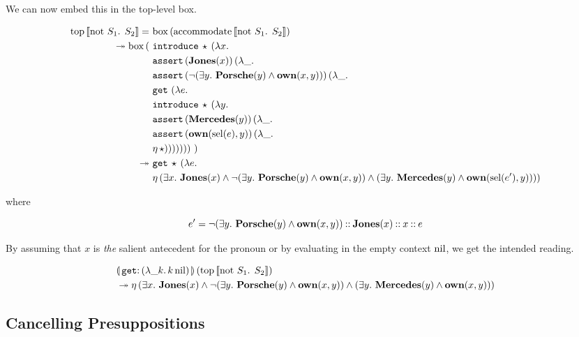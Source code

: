 We can now embed this in the top-level box.

\begin{align*}
  \ap{\TOP}{\sem{\text{not $S_1$. $S_2$}}} = &\ \ap{\BOX}{(\ap{\accommodate}{\sem{\text{not $S_1$. $S_2$}}})} \\
\tto \ap{\BOX}{(
     &\ \app{\op{introduce}}{\star}{(\lam{x}{ \\
     &\ \app{\op{assert}}{(\obj{Jones}(x))}{(\lam{\_}{ \\
     &\ \app{\op{assert}}{(\lnot (\exists y.\ \obj{Porsche}(y) \land \obj{own}(x, y)))}{(\lam{\_}{ \\
     &\ \app{\op{get}}{}{(\lam{e}{ \\
     &\ \app{\op{introduce}}{\star}{(\lam{y}{ \\
     &\ \app{\op{assert}}{(\obj{Mercedes}(y))}{(\lam{\_}{ \\
     &\ \app{\op{assert}}{(\obj{own}(\sel(e), y))}{(\lam{\_}{ \\
     &\ \etaE{\star}})}})}})}})}})}})}})}\ )} \\
\tto &\ \app{\op{get}}{\star}{(\lam{e}{ \\
     &\ \etaE{(\exists x.\
          \obj{Jones}(x) \land
          \lnot (\exists y.\ \obj{Porsche}(y) \land \obj{own}(x, y)) \land
          (\exists y.\ \obj{Mercedes}(y) \land \obj{own}(\sel(e'), y)))}})}
\end{align*}

where

$$
e' = \lnot (\exists y.\ \textbf{Porsche}(y) \land \textbf{own}(x, y)) \mathbin{::}
     \textbf{Jones}(x) \mathbin{::} x \mathbin{::} e
$$

By assuming that $x$ is \emph{the} salient antecedent for the pronoun or by
evaluating in the empty context $\mathrm{nil}$, we get the intended reading.

\begin{align*}
  &\ap{\banana{\onto{\op{get}}{(\lam{\_ k}{\ap{k}{\nil}})}}}{(\ap{\TOP}{\sem{\text{not $S_1$. $S_2$}}})} \\
  &\tto \etaE{(\exists x.\
          \obj{Jones}(x) \land
          \lnot (\exists y.\ \obj{Porsche}(y) \land \obj{own}(x, y)) \land
          (\exists y.\ \obj{Mercedes}(y) \land \obj{own}(x, y)))}
\end{align*}


\subsection{Cancelling Presuppositions}
\label{ssec:cancelling-presuppositions}


